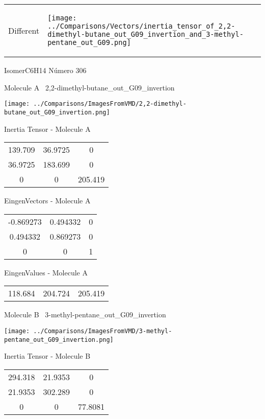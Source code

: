\vtab[-5mm]
\begin{tabular}{*{2}{m{}}}
\begin{center}
\textcolor{NavyBlue}{\Large Different}
\end{center}
&
\begin{center}
\texttt{[image: ../Comparisons/Vectors/inertia\_tensor\_of\_2,2-dimethyl-butane\_out\_G09\_invertion\_and\_3-methyl-pentane\_out\_G09.png]}
\end{center}
\end{tabular}

 \newpage

\vtab[-3cm]
\begin{center}
{\large IsomerC6H14 \tab Número 306}
\end{center}
\begin{multicols}{2}
\begin{center}

Molecule A \
2,2-dimethyl-butane\_out\_G09\_invertion

\texttt{[image: ../Comparisons/ImagesFromVMD/2,2-dimethyl-butane\_out\_G09\_invertion.png]}

Inertia Tensor - Molecule A \\
\begin{tabular}{|c c c|}
139.709	 & 	36.9725	 & 	0	 \\
36.9725	 & 	183.699	 & 	0	 \\
0	 & 	0	 & 	205.419
\end{tabular}

\vtab
 EingenVectors - Molecule A     \\
\begin{tabular}{|c c c|}
-0.869273	 & 	0.494332	 & 	0	 \\
0.494332	 & 	0.869273	 & 	0	 \\
0	 & 	0	 & 	1
\end{tabular}

\vtab
 EingenValues - Molecule A     \\
\begin{tabular}{|c c c|}
118.684	 & 	204.724	 & 	205.419	 \\
\end{tabular}
\columnbreak

Molecule B \
3-methyl-pentane\_out\_G09\_invertion

\texttt{[image: ../Comparisons/ImagesFromVMD/3-methyl-pentane\_out\_G09\_invertion.png]}

Inertia Tensor - Molecule B \\
\begin{tabular}{|c c c|}
294.318	 & 	21.9353	 & 	0	 \\
21.9353	 & 	302.289	 & 	0	 \\
0	 & 	0	 & 	77.8081
\end{tabular}


\end{center}
\end{multicols}
